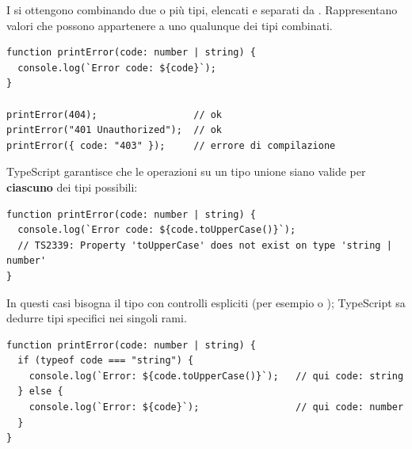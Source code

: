 I  si ottengono combinando due o più tipi, elencati e separati
da \code{|}. Rappresentano valori che possono appartenere a uno qualunque dei
tipi combinati.

\begin{lstlisting}[style=ts, name=union.ts]
function printError(code: number | string) {
  console.log(`Error code: ${code}`);
}

printError(404);                 // ok
printError("401 Unauthorized");  // ok
printError({ code: "403" });     // errore di compilazione
\end{lstlisting}

TypeScript garantisce che le operazioni su un tipo unione siano valide per
\textbf{ciascuno} dei tipi possibili:

\begin{lstlisting}[style=ts]
function printError(code: number | string) {
  console.log(`Error code: ${code.toUpperCase()}`);
  // TS2339: Property 'toUpperCase' does not exist on type 'string | number'
}
\end{lstlisting}

In questi casi bisogna  il tipo con controlli espliciti (per
esempio  o ); TypeScript sa dedurre tipi
specifici nei singoli rami.

\begin{affianco}[0.6][c]
\codicepiccolo
\begin{lstlisting}[style=ts]
function printError(code: number | string) {
  if (typeof code === "string") {
    console.log(`Error: ${code.toUpperCase()}`);   // qui code: string
  } else {
    console.log(`Error: ${code}`);                 // qui code: number
  }
}
\end{lstlisting}
\risultato
\begin{immagine}
\end{immagine}
\end{affianco}

